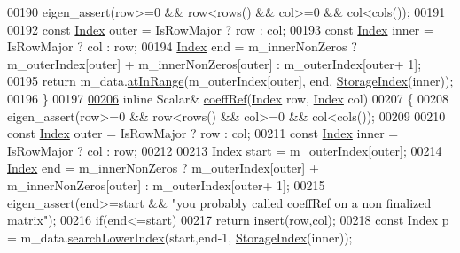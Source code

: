\begin{DoxyCode}
00190       eigen\_assert(row>=0 && row<rows() && col>=0 && col<cols());
00191       
00192       \textcolor{keyword}{const} \hyperlink{group___core___module_a554f30542cc2316add4b1ea0a492ff02}{Index} outer = IsRowMajor ? row : col;
00193       \textcolor{keyword}{const} \hyperlink{group___core___module_a554f30542cc2316add4b1ea0a492ff02}{Index} inner = IsRowMajor ? col : row;
00194       \hyperlink{group___core___module_a554f30542cc2316add4b1ea0a492ff02}{Index} end = m\_innerNonZeros ? m\_outerIndex[outer] + m\_innerNonZeros[outer] : m\_outerIndex[outer+
      1];
00195       \textcolor{keywordflow}{return} m\_data.\hyperlink{class_eigen_1_1internal_1_1_compressed_storage_a70c2745dd270aaa44b415ec2e9bf2ae0}{atInRange}(m\_outerIndex[outer], end, \hyperlink{group___sparse_core___module_a0b540ba724726ebe953f8c0df06081ed}{StorageIndex}(inner));
00196     \}
00197 
\hyperlink{group___sparse_core___module_a013197b3f598968ff37ed8c97087f1ef}{00206}     \textcolor{keyword}{inline} Scalar& \hyperlink{group___sparse_core___module_a013197b3f598968ff37ed8c97087f1ef}{coeffRef}(\hyperlink{group___core___module_a554f30542cc2316add4b1ea0a492ff02}{Index} row, \hyperlink{group___core___module_a554f30542cc2316add4b1ea0a492ff02}{Index} col)
00207     \{
00208       eigen\_assert(row>=0 && row<rows() && col>=0 && col<cols());
00209       
00210       \textcolor{keyword}{const} \hyperlink{group___core___module_a554f30542cc2316add4b1ea0a492ff02}{Index} outer = IsRowMajor ? row : col;
00211       \textcolor{keyword}{const} \hyperlink{group___core___module_a554f30542cc2316add4b1ea0a492ff02}{Index} inner = IsRowMajor ? col : row;
00212 
00213       \hyperlink{group___core___module_a554f30542cc2316add4b1ea0a492ff02}{Index} start = m\_outerIndex[outer];
00214       \hyperlink{group___core___module_a554f30542cc2316add4b1ea0a492ff02}{Index} end = m\_innerNonZeros ? m\_outerIndex[outer] + m\_innerNonZeros[outer] : m\_outerIndex[outer+
      1];
00215       eigen\_assert(end>=start && \textcolor{stringliteral}{"you probably called coeffRef on a non finalized matrix"});
00216       \textcolor{keywordflow}{if}(end<=start)
00217         \textcolor{keywordflow}{return} insert(row,col);
00218       \textcolor{keyword}{const} \hyperlink{group___core___module_a554f30542cc2316add4b1ea0a492ff02}{Index} p = m\_data.\hyperlink{class_eigen_1_1internal_1_1_compressed_storage_ad96105b5ab19886e96076513eab77da5}{searchLowerIndex}(start,end-1,
      \hyperlink{group___sparse_core___module_a0b540ba724726ebe953f8c0df06081ed}{StorageIndex}(inner));

\end{DoxyCode}
